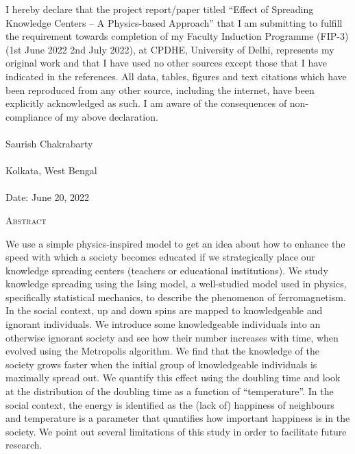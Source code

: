 \documentclass[a4paper,12pt]{article}
\begin{document}
\noindent
I hereby declare that the project report/paper titled
``Effect of Spreading Knowledge Centers -- A Physics-based Approach''
that I am submitting to fulfill the requirement towards completion
of my Faculty Induction Programme (FIP-3)
(1st June 2022  2nd July 2022), at CPDHE, University of Delhi,
represents my original work and that I have used no other
sources except those that I have indicated in the references.
All data, tables, figures and text citations which have been
reproduced from any other source, including the internet,
have been explicitly acknowledged as such. I am aware of the
consequences of non-compliance of my above declaration.\\~\\



\noindent
Saurish Chakrabarty\\~\\
Kolkata, West Bengal\\~\\
Date: June 20, 2022

\clearpage\pagebreak
\doublespacing
\begin{center}
  \Large{\textsc{Abstract}}
\end{center}
We use a simple physics-inspired model to get an idea about how to
enhance the speed with which a society becomes
educated if we strategically place our knowledge spreading centers
(teachers or educational institutions).
We study knowledge spreading using the Ising model, a well-studied
model used in physics, specifically statistical mechanics,
to describe the phenomenon of ferromagnetism.
In the social context, up and down spins are mapped to knowledgeable and ignorant
individuals.
We introduce some knowledgeable individuals into an otherwise ignorant society and see
how their number increases with time, when evolved using the Metropolis algorithm.
We find that the knowledge of the society grows faster when the initial group of
knowledgeable individuals is maximally spread out.
We quantify this effect using the doubling time and look at the distribution of the
doubling time as a function of ``temperature''.
In the social context, the energy is identified as the (lack of) happiness of neighbours
and temperature is a parameter that quantifies how important happiness is
in the society.
We point out several limitations
of this study in order to facilitate future research.
\end{document}
